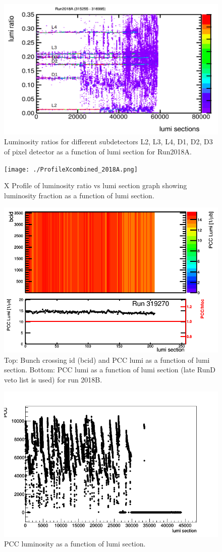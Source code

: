 \begin{figure}[H]
  \centering
  \includegraphics[width=0.5\columnwidth]{./2018A_lumiratio.png}
  \caption{Luminosity ratios for different subdetectors L2, L3, L4, D1, D2, D3 of pixel detector as a function of lumi section for Run2018A.}
  \label{fig:CMS}
\end{figure}



\begin{figure}[H]
  \centering
  \texttt{[image: ./ProfileXcombined\_2018A.png]}
  \caption{X Profile of luminosity ratio vs lumi section graph showing luminosity fraction as a function of lumi section.}
  \label{fig:CMS}
\end{figure}





\begin{figure}[H]
  \centering
  \includegraphics[width=0.5\columnwidth]{./319270.png}
  \caption{Top: Bunch crossing id (bcid) and PCC lumi as a function of lumi section. Bottom: PCC lumi as a function of lumi section (late RunD veto list is used) for run 2018B.}
  \label{fig:CMS}
\end{figure}


\begin{figure}[H]
  \centering
  \includegraphics[width=0.5\columnwidth]{./ls_lumi_2018B.png}
  \caption{PCC luminosity as a function of lumi section.}
  \label{fig:CMS}
\end{figure}


